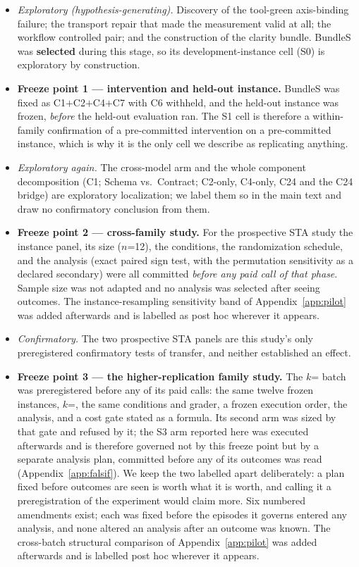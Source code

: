 \documentclass{article}
\begin{document}
\begin{itemize}
\item \emph{Exploratory (hypothesis-generating).} Discovery of the tool-green axis-binding failure; the transport repair that made the measurement valid at all; the workflow controlled pair; and the construction of the clarity bundle. BundleS was \textbf{selected} during this stage, so its development-instance cell (S0) is exploratory by construction.
\item \textbf{Freeze point 1 --- intervention and held-out instance.} BundleS was fixed as C1$+$C2$+$C4$+$C7 with C6 withheld, and the held-out instance was frozen, \emph{before} the held-out evaluation ran. The S1 cell is therefore a within-family confirmation of a pre-committed intervention on a pre-committed instance, which is why it is the only cell we describe as replicating anything.
\item \emph{Exploratory again.} The cross-model arm and the whole component decomposition (C1; Schema vs.\ Contract; C2-only, C4-only, C24 and the C24 bridge) are exploratory localization; we label them so in the main text and draw no confirmatory conclusion from them.
\item \textbf{Freeze point 2 --- cross-family study.} For the prospective STA study the instance panel, its size ($n$=12), the conditions, the randomization schedule, and the analysis (exact paired sign test, with the permutation sensitivity as a declared secondary) were all committed \emph{before any paid call of that phase}. Sample size was not adapted and no analysis was selected after seeing outcomes. The instance-resampling sensitivity band of Appendix~\ref{app:pilot} was added afterwards and is labelled as post hoc wherever it appears.
\item \emph{Confirmatory.} The two prospective STA panels are this study's only preregistered confirmatory tests of transfer, and neither established an effect.
\item \textbf{Freeze point 3 --- the higher-replication family study.} The $k$=\StatEightAK{} batch was preregistered before any of its paid calls: the same twelve frozen instances, $k$=\StatEightAK{}, the same conditions and grader, a frozen execution order, the analysis, and a cost gate stated as a formula. Its second arm was sized by that gate and refused by it; the S3 arm reported here was executed afterwards and is therefore governed not by this freeze point but by a separate analysis plan, committed before any of its outcomes was read (Appendix~\ref{app:falsif}). We keep the two labelled apart deliberately: a plan fixed before outcomes are seen is worth what it is worth, and calling it a preregistration of the experiment would claim more. Six numbered amendments exist; each was fixed before the episodes it governs entered any analysis, and none altered an analysis after an outcome was known. The cross-batch structural comparison of Appendix~\ref{app:pilot} was added afterwards and is labelled post hoc wherever it appears.
\end{itemize}
\end{document}
